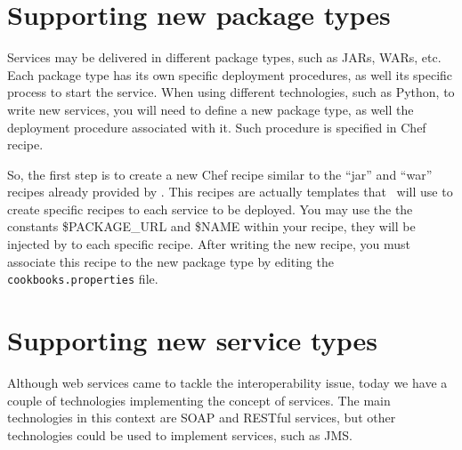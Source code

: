 \section{Supporting new package types}

Services may be delivered in different package types, such as JARs, WARs, etc.
Each package type has its own specific deployment procedures, as well its specific process to start the service.
When using different technologies, such as Python, to write new services, you will need to define a new package type,
as well the deployment procedure associated with it. Such procedure is specified in Chef recipe. 

So, the first step is to create a new Chef recipe similar to the ``jar'' and ``war'' recipes already provided by \ee.
This recipes are actually templates that \ee\ will use to create specific recipes to each service to be deployed.
You may use the the constants \$PACKAGE\_URL and \$NAME within your recipe, they will be injected by \ee to each specific recipe.
After writing the new recipe, you must associate this recipe to the new package type by editing the \texttt{cookbooks.properties} file.


%
%
%
%


\section{Supporting new service types}

Although web services came to tackle the interoperability issue, today we have a couple of technologies implementing the concept of services.
The main technologies in this context are SOAP and RESTful services, but other technologies could be used to implement services, such as JMS.

